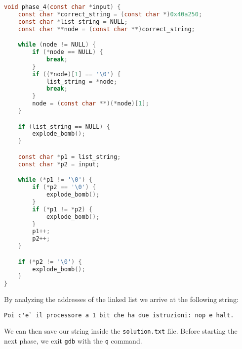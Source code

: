 \documentclass[a4paper,12pt]{report}  %
\newcommand{\lstinlinebg}[1]{\colorbox{backcolour}{\lstinline|#1|}}
\begin{document}
\begin{lstlisting}[language=C,keywords={int, char, if, void, explode_bomb, const, while, NULL}]
void phase_4(const char *input) {
    const char *correct_string = (const char *)0x40a250;
    const char *list_string = NULL;
    const char **node = (const char **)correct_string;

    while (node != NULL) {
        if (*node == NULL) {
            break;
        }
        if ((*node)[1] == '\0') {
            list_string = *node;
            break;
        }
        node = (const char **)(*node)[1];
    }

    if (list_string == NULL) {
        explode_bomb();
    }

    const char *p1 = list_string;
    const char *p2 = input;

    while (*p1 != '\0') {
        if (*p2 == '\0') {
            explode_bomb();
        }
        if (*p1 != *p2) {
            explode_bomb();
        }
        p1++;
        p2++;
    }

    if (*p2 != '\0') {
        explode_bomb();
    }
}
\end{lstlisting}
By analyzing the addresses of the linked list we arrive at the following string:
\begin{lstlisting}[numbers=none]
Poi c'e` il processore a 1 bit che ha due istruzioni: nop e halt.
\end{lstlisting}
We can then save our string inside the \lstinlinebg{solution.txt} file.
Before starting the next phase, we exit \lstinlinebg{gdb} with the \lstinlinebg{q} command.
\end{document}
